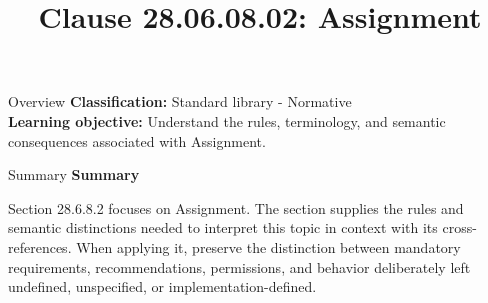 \documentclass[10pt,letterpaper]{article}
\title{Clause 28.06.08.02: Assignment}
\author{}
\date{}
\begin{document}
\maketitle
\begin{CornellOverviewBox}{Overview}
\textbf{Classification:} Standard library - Normative\\[2pt]
\textbf{Learning objective:} Understand the rules, terminology, and semantic consequences associated with Assignment.
\end{CornellOverviewBox}\begin{CornellSummaryBox}{Summary}
{\sffamily\bfseries\color{Accent} Summary}\par\vspace{3pt}Section 28.6.8.2 focuses on Assignment. The section supplies the rules and semantic distinctions needed to interpret this topic in context with its cross-references. When applying it, preserve the distinction between mandatory requirements, recommendations, permissions, and behavior deliberately left undefined, unspecified, or implementation-defined.
\end{CornellSummaryBox}
\end{document}
